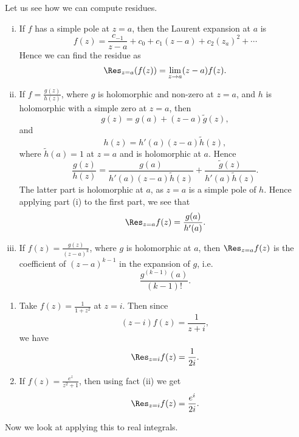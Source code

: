 \documentclass[12pt]{article}
\begin{document}
Let us see how we can compute residues.
\begin{enumerate}[(i)]
	\item If $f$ has a simple pole at $z = a$, then the Laurent expansion at $a$ is
		\[
			f(z) = \frac{c_{-1}}{z-a} + c_0 + c_1(z-a) + c_2 (z_a)^2 + \cdots
		\]
		Hence we can find the residue as
		\[
			\Res_{z=a}(f(z)) = \lim_{z \to a}(z-a) f(z).
		\]
	\item If $f = \frac{g(z)}{h(z)}$, where $g$ is holomorphic and non-zero at $z = a$, and $h$ is holomorphic with a simple zero at $z = a$, then
		\[
		g(z) = g(a) + (z-a) \tilde g(z),
		\]
		and
		\[
		h(z) = h'(a) (z-a) \tilde h(z),
		\]
		where $\tilde h(a) = 1$ at $z = a$ and is holomorphic at $a$. Hence
		\[
		\frac{g(z)}{h(z)} = \frac{g(a)}{h'(a) (z-a)\tilde h(z)} + \frac{\tilde g(z)}{h'(a)\tilde h(z)}.
		\]
		The latter part is holomorphic at $a$, as $z = a$ is a simple pole of $h$. Hence applying part (i) to the first part, we see that
		\[
			\Res_{z=a}f(z) = \frac{g(a)}{h'(a)}.
		\]
	\item If $f(z) = \frac{g(z)}{(z-a)^{k}}$, where $g$ is holomorphic at $a$, then $\Res_{z=a} f(z)$ is the coefficient of $(z-a)^{k-1}$ in the expansion of $g$, i.e.
		\[
		\frac{g^{(k-1)}(a)}{(k-1)!}.
		\]
\end{enumerate}

\begin{exbox}
	\begin{enumerate}
		\item Take $f(z) = \frac{1}{1 + z^2}$ at $z = i$. Then since
		\[
			(z-i) f(z) = \frac{1}{z + i},
		\]
		we have
		\[
			\Res_{z=i}f(z) = \frac{1}{2i}.
		\]
	\item If $f(z) = \frac{e^{z}}{z^2 + 1}$, then using fact (ii) we get
		\[
			\Res_{z=i} f(z) = \frac{e^{i}}{2i}.
		\]
	\end{enumerate}
\end{exbox}

Now we look at applying this to real integrals.
\end{document}

